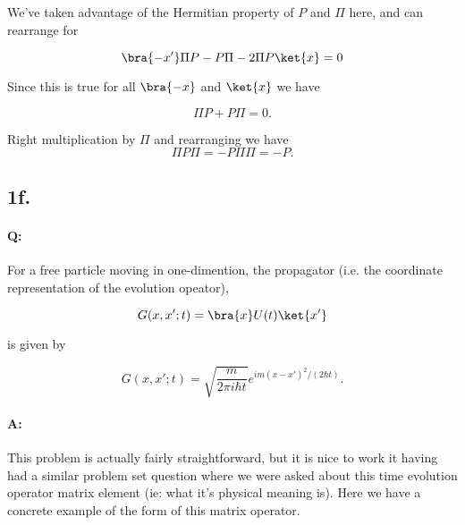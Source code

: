 We've taken advantage of the Hermitian property of $P$ and $\Pi$ here, and can rearrange for

\begin{equation}\label{eqn:qmIexamPractice2007Dec:1b:10}
\bra{-x'} \Pi P - P \Pi - 2 \Pi P \ket{x} = 0
\end{equation}

Since this is true for all $\bra{-x}$ and $\ket{x}$ we have

\begin{equation}\label{eqn:qmIexamPractice2007Dec:1b:20}
\Pi P + P \Pi = 0.
\end{equation}

Right multiplication by $\Pi$ and rearranging we have
\begin{equation}\label{eqn:qmIexamPractice2007Dec:1b:30}
\Pi P \Pi = - P \Pi \Pi = - P.
\end{equation}

\subsection{1f.}

\paragraph{Q:} For a free particle moving in one-dimention, the propagator (i.e. the coordinate representation of the evolution opeator),

\begin{equation}\label{eqn:qmIexamPractice2007Dec:1f:10}
G(x,x';t) = \bra{x} U(t) \ket{x'}
\end{equation}

is given by

\begin{equation}\label{eqn:qmIexamPractice2007Dec:1f:20}
G(x,x';t) = \sqrt{\frac{m}{2 \pi i \hbar t}} e^{i m (x-x')^2/ (2 \hbar t)}.
\end{equation}

\paragraph{A:}

This problem is actually fairly straightforward, but it is nice to work it having had a similar problem set question where we were asked about this time evolution operator matrix element (ie: what it's physical meaning is).  Here we have a concrete example of the form of this matrix operator.

